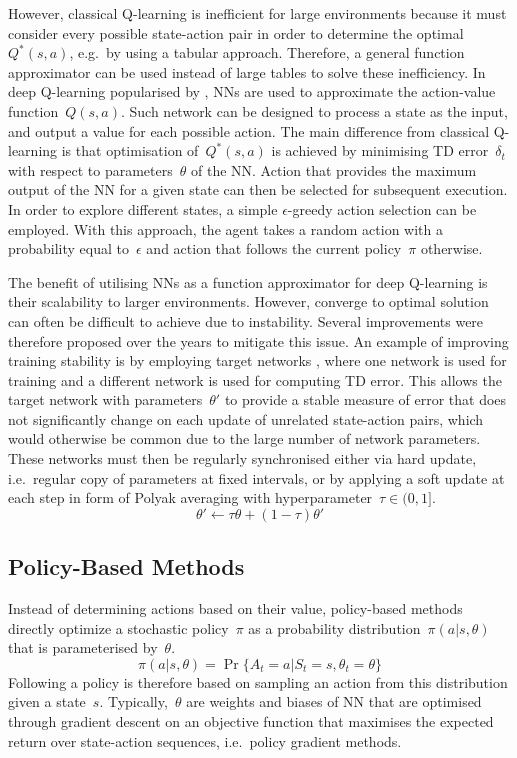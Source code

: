 However, classical Q-learning is inefficient for large environments because it must consider every possible state-action pair in order to determine the optimal~\(Q^{*}(s, a)\), e.g.~by using a tabular approach. Therefore, a general function approximator can be used instead of large tables to solve these inefficiency. In deep Q-learning popularised by \citet{mnih_human-level_2015}, NNs are used to approximate the action-value function~\(Q(s, a)\). Such network can be designed to process a state as the input, and output a value for each possible action. The main difference from classical Q-learning is that optimisation of~\(Q^{*}(s, a)\) is achieved by minimising TD error~\(\delta_{t}\) with respect to parameters~\(\theta\) of the NN. Action that provides the maximum output of the NN for a given state can then be selected for subsequent execution. In order to explore different states, a simple \(\epsilon\)-greedy action selection can be employed. With this approach, the agent takes a random action with a probability equal to~\(\epsilon\) and action that follows the current policy~\(\pi\) otherwise.

The benefit of utilising NNs as a function approximator for deep Q-learning is their scalability to larger environments. However, converge to optimal solution can often be difficult to achieve due to instability. Several improvements were therefore proposed over the years to mitigate this issue. An example of improving training stability is by employing target networks \cite{mnih_human-level_2015}, where one network is used for training and a different network is used for computing TD error. This allows the target network with parameters~\(\theta'\) to provide a stable measure of error that does not significantly change on each update of unrelated state-action pairs, which would otherwise be common due to the large number of network parameters. These networks must then be regularly synchronised either via hard update, i.e.~regular copy of parameters at fixed intervals, or by applying a soft update at each step in form of Polyak averaging with hyperparameter~\(\tau \in (0, 1]\).
\begin{equation}
    \theta' \leftarrow \tau \theta + (1-\tau) \theta'
\end{equation}


\subsection{Policy-Based Methods}

Instead of determining actions based on their value, policy-based methods directly optimize a stochastic policy~\(\pi\) as a probability distribution~\(\pi(a \vert s, \theta)\) that is parameterised by~\(\theta\).
\begin{equation}
    \pi(a \vert s, \theta) = \Pr\{A_{t}{=}a \vert S_{t}{=}s, \theta_{t}{=}\theta \}
\end{equation}
Following a policy is therefore based on sampling an action from this distribution given a state~\(s\). Typically,~\(\theta\) are weights and biases of NN that are optimised through gradient descent on an objective function that maximises the expected return over state-action sequences, i.e.~policy gradient methods.

